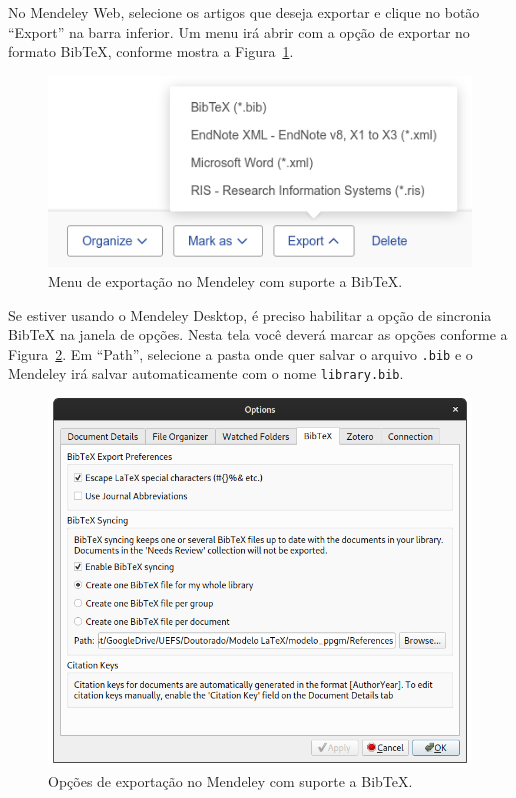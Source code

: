 No Mendeley Web, selecione os artigos que deseja exportar e clique no botão ``Export'' na barra inferior. Um menu irá abrir com a opção de exportar no formato BibTeX, conforme mostra a Figura~\ref{fig:bibtex_mendeley}.

\begin{figure}[h]
    \centering
    \includegraphics[scale=0.5]{Figures/bibtex_mendeley.png}
    \caption{Menu de exportação no Mendeley com suporte a BibTeX.}
    \label{fig:bibtex_mendeley}
\end{figure}

Se estiver usando o Mendeley Desktop, é preciso habilitar a opção de sincronia BibTeX na janela de opções. Nesta tela você deverá marcar as opções conforme a Figura~\ref{fig:bibtex_mendeley_desktop}. Em ``Path'', selecione a pasta onde quer salvar o arquivo \verb=.bib= e o Mendeley irá salvar automaticamente com o nome \verb=library.bib=.

\begin{figure}[h]
    \centering
    \includegraphics[scale=0.5]{Figures/bibtex_mendeley_desktop.png}
    \caption{Opções de exportação no Mendeley com suporte a BibTeX.}
    \label{fig:bibtex_mendeley_desktop}
\end{figure}

